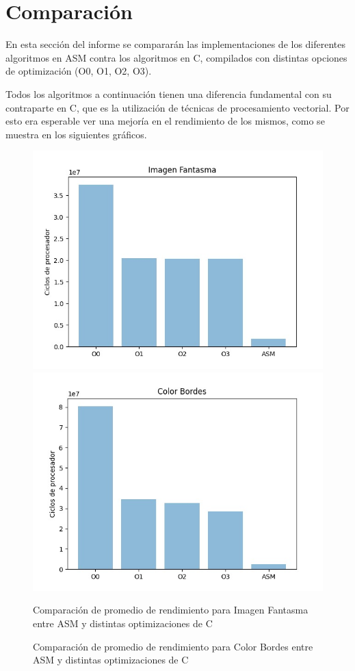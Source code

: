 \newpage
\section{Comparación}
\par En esta sección del informe se compararán las implementaciones de los diferentes algoritmos en ASM contra los algoritmos en C, compilados con distintas
opciones de optimización (O0, O1, O2, O3).
\par Todos los algoritmos a continuación tienen una diferencia fundamental con su contraparte en C, que es la utilización de técnicas de procesamiento vectorial.
Por esto era esperable ver una mejoría en el rendimiento de los mismos, como se muestra en los siguientes gráficos. \\

\begin{figure}[h]
    \centering
        \includegraphics[width=0.5\linewidth]{img/ImagenFantasma.jpeg}\hfil
        \includegraphics[width=0.5\linewidth]{img/ColorBordes.jpeg}\par\medskip
        \caption{Comparación de promedio de rendimiento para Imagen Fantasma entre ASM y distintas optimizaciones de C}
        \caption{Comparación de promedio de rendimiento para Color Bordes entre ASM y distintas optimizaciones de C}
    \end{figure}
    
